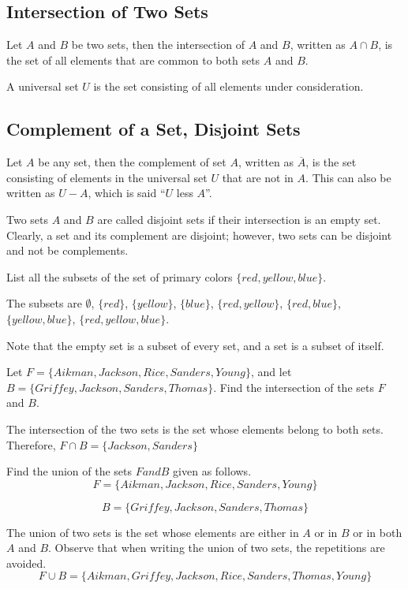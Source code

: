 \subsection{Intersection of Two Sets}

Let $A$ and $B$ be two sets, then the intersection of $A$ and $B$, written as $A \cap B$, is the set of all elements that are common to both sets $A$ and $B$.

A universal set $U$ is the set consisting of all elements under consideration.

\subsection{Complement of a Set, Disjoint Sets}

Let $A$ be any set, then the complement of set $A$, written as $\overline{A}$, is the set consisting of elements in the universal set $U$ that are not in $A$. This can also be written as $U-A$, which is said ``$U$ less $A$''.

Two sets $A$ and $B$ are called disjoint sets if their intersection is an empty set. Clearly, a set and its complement are disjoint; however, two sets can be disjoint and not be complements.


\begin{example}
    List all the subsets of the set of primary colors $\{red, yellow, blue\}$.
\end{example}
\begin{solution}
    The subsets are $\emptyset$, $\{red\}$, $\{yellow\}$, $\{blue\}$, $\{red, yellow\}$, $\{red, blue\}$, $\{yellow, blue\}$, $\{red, yellow, blue\}$.

    Note that the empty set is a subset of every set, and a set is a subset of itself.
\end{solution}

\begin{example}
    Let $F = \{Aikman, Jackson, Rice, Sanders, Young\}$, and let $B = \{Griffey, Jackson, Sanders, Thomas\}$. Find the intersection of the sets $F$ and $B$.
\end{example}
\begin{solution}
    The intersection of the two sets is the set whose elements belong to both sets. Therefore, $F \cap B = \{Jackson, Sanders\}$
\end{solution}

\begin{example}
    Find the union of the sets $F and B$ given as follows.
    \[F = \{Aikman, Jackson, Rice, Sanders, Young\}\]

    \[B = \{Griffey, Jackson, Sanders, Thomas\}\]

\end{example}
\begin{solution}
    The union of two sets is the set whose elements are either in $A$ or in $B$ or in both $A$ and $B$. Observe that when writing the union of two sets, the repetitions are avoided.
    \[
        F \cup B = \{Aikman, Griffey, Jackson, Rice, Sanders, Thomas, Young\}
    \]
\end{solution}

